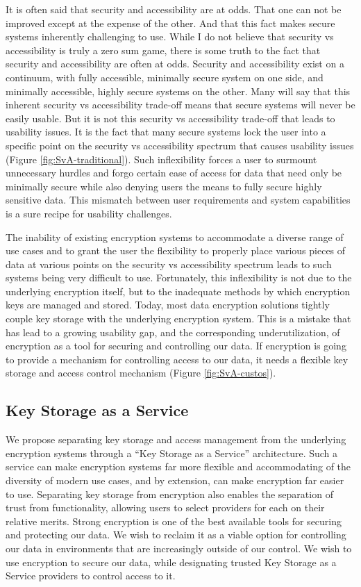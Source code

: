 It is often said that security and accessibility are at odds. That one
can not be improved except at the expense of the other. And that this
fact makes secure systems inherently challenging to use. While I do
not believe that security vs accessibility is truly a zero sum game,
there is some truth to the fact that security and accessibility are
often at odds. Security and accessibility exist on a continuum, with
fully accessible, minimally secure system on one side, and minimally
accessible, highly secure systems on the other. Many will say that
this inherent security vs accessibility trade-off means that secure
systems will never be easily usable. But it is not this security vs
accessibility trade-off that leads to usability issues. It is the fact
that many secure systems lock the user into a specific point on the
security vs accessibility spectrum that causes usability issues
(Figure \ref{fig:SvA-traditional}). Such inflexibility forces a user
to surmount unnecessary hurdles and forgo certain ease of access for
data that need only be minimally secure while also denying users the
means to fully secure highly sensitive data. This mismatch between
user requirements and system capabilities is a sure recipe for
usability challenges.

The inability of existing encryption systems to accommodate a diverse
range of use cases and to grant the user the flexibility to properly
place various pieces of data at various points on the security vs
accessibility spectrum leads to such systems being very difficult to
use. Fortunately, this inflexibility is not due to the underlying
encryption itself, but to the inadequate methods by which encryption
keys are managed and stored. Today, most data encryption solutions
tightly couple key storage with the underlying encryption system. This
is a mistake that has lead to a growing usability gap, and the
corresponding underutilization, of encryption as a tool for securing
and controlling our data. If encryption is going to provide a
mechanism for controlling access to our data, it needs a flexible key
storage and access control mechanism (Figure \ref{fig:SvA-custos}).

\subsection{Key Storage as a Service}

We propose separating key storage and access management from the
underlying encryption systems through a ``Key Storage as a Service''
architecture. Such a service can make encryption systems far more
flexible and accommodating of the diversity of modern use cases, and
by extension, can make encryption far easier to use. Separating key
storage from encryption also enables the separation of trust from
functionality, allowing users to select providers for each on their
relative merits. Strong encryption is one of the best available tools
for securing and protecting our data. We wish to reclaim it as a
viable option for controlling our data in environments that are
increasingly outside of our control. We wish to use encryption to
secure our data, while designating trusted Key Storage as a Service
providers to control access to it.

